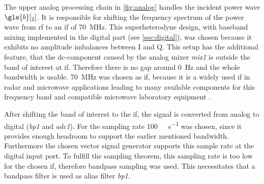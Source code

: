 \documentclass[12pt,a4paper,parskip=full,abstract=true,BCOR=12mm]{scrreprt}
\def\device#1{\mbox{\textit{#1}}}
\begin{document}
The upper analog processing chain in \cref{fig:analog} handles the
incident power wave $\gls{b}[_2]$. It is responsible for shifting the frequency spectrum
of the power wave from \gls{rf} to an \gls{if} of \SI{70}{\mega\hertz}. This
superheterodyne design, with baseband mixing implemented in the digital
part (see \cref{sec:digital}), was chosen because it exhibits no amplitude
imbalances between I and Q. This setup has the additional feature, that
the \gls{dc}-component caused by the analog mixer \device{mix1} is outside the
band of interest at \gls{if}. Therefore there is no gap around \SI{0}{\hertz}
and the whole bandwidth is usable. \SI{70}{\mega\hertz} was chosen as \gls{if},
because it is a widely used \gls{if} in radar and microwave applications
\cite{tozer_broadcast_2004,ahamed_design_1997,whitaker_rf_2002,penttinen_telecommunications_2015}
leading to many available components for this frequency band and compatible microwave
laboratory equipment \cite{agilent_h70}.

After shifting the band of interest to the \gls{if}, the signal is converted from
analog to digital (\device{bp1} and \device{adc1}). For the sampling rate
\SI{100}{\mega\samples\per\second} was chosen, since it provides enough headroom to
support the earlier mentioned bandwidth. Furthermore the chosen vector signal generator supports this sample rate
at the digital input port. To fulfill the sampling theorem, this sampling rate is too low for the chosen
\gls{if}, therefore bandpass sampling was used. This necessitates that a bandpass
filter is used as alias filter \device{bp1}.
\end{document}
